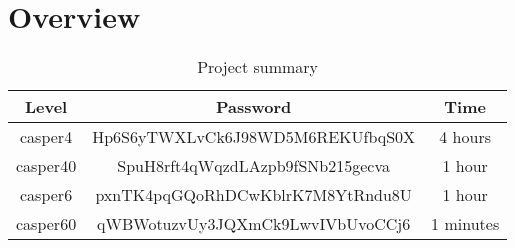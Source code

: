 \section{Overview}
\begin{table}[h]
	\centering
	\label{tbl:summary}
	\begin{tabular}{|c|c|c|}
		\hline
		\textbf{Level} & \textbf{Password} 								& \textbf{Time} \\ \hline
		casper4        & Hp6S6yTWXLvCk6J98WD5M6REKUfbqS0X               & 4 hours       \\ \hline
		casper40       & SpuH8rft4qWqzdLAzpb9fSNb215gecva				& 1 hour        \\ \hline
		casper6        & pxnTK4pqGQoRhDCwKblrK7M8YtRndu8U				& 1 hour        \\ \hline
		casper60       & qWBWotuzvUy3JQXmCk9LwvIVbUvoCCj6				& 1 minutes    \\ \hline
	\end{tabular}
	\caption{Project summary}
\end{table}
